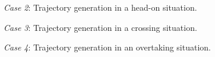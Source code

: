 \begin{figure}[htbp]
    \centering
    
    \caption{\emph{Case 2}: Trajectory generation in a head-on situation.}
    \label{fig:head-on}
\end{figure}


\label{sec:case-3-crossing}
\begin{figure}[htbp]
    \centering
    
    \caption{\emph{Case 3}: Trajectory generation in a crossing situation.}
    \label{fig:crossing}
\end{figure}



\label{sec:case-4-overtaking}
\begin{figure}[htbp]
    \centering
    
    \caption{\emph{Case 4}: Trajectory generation in an overtaking situation.}
    \label{fig:overtaking}
\end{figure}